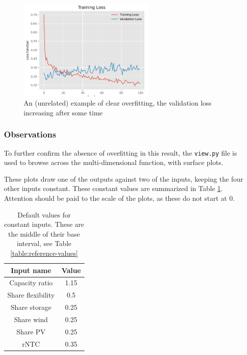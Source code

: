\begin{figure}[h]
    \centering
    \includegraphics[width=0.6\textwidth]{resources/images/overfitting.png}
    \caption{An (unrelated) example of clear overfitting, the validation loss increasing after some time}
    \label{fig:overfitting}
\end{figure}

\subsubsection{Observations \label{ssec:surrogate-model-surf-observations}}

To further confirm the absence of overfitting in this result, the \texttt{view.py} file is used to browse across the multi-dimensional function, with surface plots.

These plots draw one of the outputs against two of the inputs, keeping the four other inputs constant. These constant values are summarized in Table \ref{tab:default-view-values}. Attention should be paid to the scale of the plots, as these do not start at 0.

\begin{table}[h!]
    \centering
    \begin{tabular}{|c|c|}
        \hline
        Input name & Value \\ \hline
        Capacity ratio & 1.15 \\
        Share flexibility & 0.5 \\
        Share storage & 0.25 \\
        Share wind & 0.25 \\
        Share PV & 0.25 \\
        rNTC & 0.35 \\ \hline
    \end{tabular}
    \caption{Default values for constant inputs. These are the middle of their base interval, see Table \ref{table:reference-values}}
    \label{tab:default-view-values}
\end{table}

